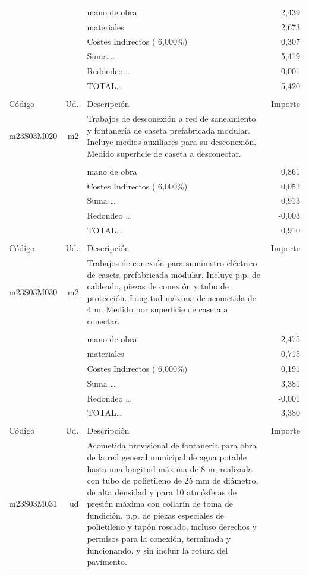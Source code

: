 \documentclass{book}%
\begin{document}
\begin{supertabular}{l r p{60mm} r}
&&mano de obra&     2,439\\%
&&materiales&     2,673\\%
&&Costes Indirectos (     6,000\%)&     0,307\\%
&&Suma \ldots&     5,419\\%
&&Redondeo \ldots&     0,001\\%
%
&&TOTAL\ldots&     5,420\\%
&&&\\%
Código&Ud.&Descripción&Importe\\%
\hline%
m23S03M020&m2&Trabajos de desconexión a red de saneamiento y fontanería de caseta prefabricada modular. Incluye medios auxiliares para su desconexión. Medido superficie de caseta a desconectar.&\\%
&&&\\%
&&mano de obra&     0,861\\%
&&Costes Indirectos (     6,000\%)&     0,052\\%
&&Suma \ldots&     0,913\\%
&&Redondeo \ldots&    {-}0,003\\%
%
&&TOTAL\ldots&     0,910\\%
&&&\\%
Código&Ud.&Descripción&Importe\\%
\hline%
m23S03M030&m2&Trabajos de conexión para suministro eléctrico de caseta prefabricada modular. Incluye p.p. de cableado, piezas de conexión y tubo de protección. Longitud máxima de acometida de 4 m. Medido por superficie de caseta a conectar.&\\%
&&&\\%
&&mano de obra&     2,475\\%
&&materiales&     0,715\\%
&&Costes Indirectos (     6,000\%)&     0,191\\%
&&Suma \ldots&     3,381\\%
&&Redondeo \ldots&    {-}0,001\\%
%
&&TOTAL\ldots&     3,380\\%
&&&\\%
Código&Ud.&Descripción&Importe\\%
\hline%
m23S03M031&ud&Acometida provisional de fontanería para obra de la red general municipal de agua potable hasta una longitud máxima de 8 m, realizada con tubo de polietileno de 25 mm de diámetro, de alta densidad y para 10 atmósferas de presión máxima con collarín de toma de fundición, p.p. de piezas especiales de polietileno y tapón roscado, incluso derechos y permisos para la conexión, terminada y funcionando, y sin incluir la rotura del pavimento.&\\%

\end{supertabular}
\end{document}
